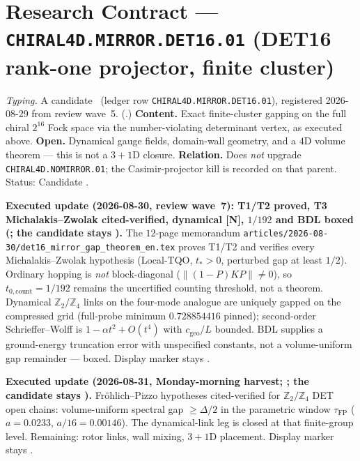 \documentclass[11pt,a4paper]{article}
\begin{document}
\section*{Research Contract --- \texttt{CHIRAL4D.MIRROR.DET16.01} (DET16 rank-one projector, finite cluster)}
\noindent\emph{Typing.} A candidate \mC\ (ledger row \texttt{CHIRAL4D.MIRROR.DET16.01}),
registered 2026-08-29 from review wave~5.
(.)
\textbf{Content.}  Exact finite-cluster gapping on the full chiral $2^{16}$ Fock space via the
number-violating determinant vertex, as executed above.  \textbf{Open.}  Dynamical gauge fields,
domain-wall geometry, and a $4$D volume theorem --- this is not a $3{+}1$D closure.
\textbf{Relation.}  Does \emph{not} upgrade \texttt{CHIRAL4D.NOMIRROR.01}; the Casimir-projector
kill is recorded on that parent.  Status: Candidate \mC.

\par\smallskip\noindent\textbf{Executed update (2026-08-30, review wave~7): T1/T2 proved, T3
Michalakis--Zwolak cited-verified, dynamical [N], $1/192$ and BDL boxed
(;
the candidate stays \mC).}
The $12$-page memorandum
\texttt{articles/2026-08-30/\allowbreak det16\_\allowbreak mirror\_\allowbreak gap\_\allowbreak theorem\_\allowbreak en.tex}
proves T1/T2 and verifies every Michalakis--Zwolak hypothesis (Local-TQO, $t_*>0$, perturbed
gap at least $1/2$).  Ordinary hopping is \emph{not} block-diagonal
($\lVert(1-P)KP\rVert\neq0$), so $t_{0,\mathrm{count}}=1/192$ remains the uncertified counting
threshold, not a theorem.  Dynamical $\mathbb Z_2/\mathbb Z_4$ links on the four-mode analogue
are uniquely gapped on the compressed grid (full-probe minimum $0.728854416$ pinned);
second-order Schrieffer--Wolff is $1-\alpha t^2+O(t^4)$ with $c_{\mathrm{geo}}/L$ bounded.
BDL supplies a ground-energy truncation error with unspecified constants, not a volume-uniform
gap remainder --- boxed.  Display marker stays \mC.

\par\smallskip\noindent\textbf{Executed update (2026-08-31, Monday-morning harvest;
;
the candidate stays \mC).}
Fröhlich--Pizzo hypotheses cited-verified for $\mathbb Z_2/\mathbb Z_4$ DET open chains:
volume-uniform spectral gap $\ge\Delta/2$ in the parametric window $\tau_{\mathrm{FP}}$
($a=0.0233$, $a/16=0.00146$).  The dynamical-link leg is closed at that finite-group
level.  Remaining: rotor links, wall mixing, $3{+}1$D placement.  Display marker stays \mC.
\end{document}
